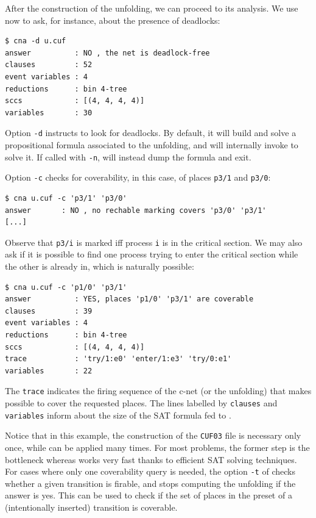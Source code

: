 \documentclass[a4paper]{refart}
\begin{document}
After the construction of the unfolding, we can proceed to its analysis.
We use now \cna{} to ask, for instance, about the presence of deadlocks:
\begin{verbatim}
$ cna -d u.cuf
answer          : NO , the net is deadlock-free
clauses         : 52
event variables : 4
reductions      : bin 4-tree
sccs            : [(4, 4, 4, 4)]
variables       : 30
\end{verbatim}
Option \verb!-d! instructs \cna{} to look for deadlocks.
By default, it will build and solve a propositional formula associated to the
unfolding, and will internally invoke \minisat to solve it.
If called with \verb!-n!, \cna will instead dump the formula and exit.

Option \verb!-c! checks for coverability, in this case, of places
\verb!p3/1! and \verb!p3/0!:
\begin{verbatim}
$ cna u.cuf -c 'p3/1' 'p3/0'
answer       : NO , no rechable marking covers 'p3/0' 'p3/1'
[...]
\end{verbatim}
Observe that \verb!p3/i! is marked iff process \verb!i! is in the critical
section.
We may also ask if it is possible to find one process trying to enter the
critical section while the other is already in, which is naturally possible:
\begin{verbatim}
$ cna u.cuf -c 'p1/0' 'p3/1'
answer          : YES, places 'p1/0' 'p3/1' are coverable
clauses         : 39
event variables : 4
reductions      : bin 4-tree
sccs            : [(4, 4, 4, 4)]
trace           : 'try/1:e0' 'enter/1:e3' 'try/0:e1'
variables       : 22
\end{verbatim}

The \verb!trace! indicates the firing sequence of the c-net (or the unfolding)
that makes possible to cover the requested places.
The lines labelled by \verb!clauses! and \verb!variables! inform about the
size of the SAT formula fed to \minisat.

Notice that in this example, the construction of the \verb!CUF03! file
is necessary only once, while \cna can be applied many times. For most
problems, the former step is the bottleneck whereas \cna works very fast
thanks to efficient SAT solving techniques. For cases where only one
coverability query is needed,
the option \verb!-t! of \cunf checks whether a given transition is
firable, and stops computing the unfolding if the answer is yes.
This can be used to check if the set of places in the preset of
a (intentionally inserted) transition is coverable.
\end{document}
